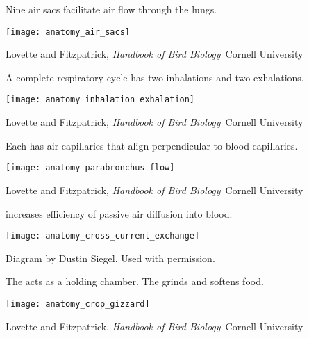 \documentclass[t]{beamer}
\begin{document}
{
\begin{frame}[t,plain]{Nine air sacs facilitate air flow through the lungs.}

	\vspace{-0.5\baselineskip}
	
	\centering
	
	\texttt{[image: anatomy\_air\_sacs]}
	
	\vfilll
	
	\tiny \hfill Lovette and Fitzpatrick, \textit{Handbook of Bird Biology} \textcopyright\,Cornell University
\end{frame}
}
%
\begin{frame}[t,plain]{A complete respiratory cycle has two inhalations and two exhalations.}

	\texttt{[image: anatomy\_inhalation\_exhalation]}
		
	\vfilll
	
	\tiny \hfill Lovette and Fitzpatrick, \textit{Handbook of Bird Biology} \textcopyright\,Cornell University
\end{frame}
\begin{frame}[t,plain]{Each  has air capillaries that align perpendicular to blood capillaries.}

	\texttt{[image: anatomy\_parabronchus\_flow]}
		
	\vfilll
	
	\tiny \hfill Lovette and Fitzpatrick, \textit{Handbook of Bird Biology} \textcopyright\,Cornell University

\end{frame}

\begin{frame}[t,plain]{ increases efficiency of passive air diffusion into blood.}

	\centering
	
	\texttt{[image: anatomy\_cross\_current\_exchange]}
		
	\vfilll
	
	\tiny \hfill Diagram by Dustin Siegel. Used with permission.
\end{frame}


\begin{frame}[t]{The  acts as a holding chamber. The  grinds and softens food.}

	\vspace{-\baselineskip}
	
	\centering
	
	\texttt{[image: anatomy\_crop\_gizzard]}
		
	\vfilll
	
	\tiny \hfill Lovette and Fitzpatrick, \textit{Handbook of Bird Biology} \textcopyright\,Cornell University

\end{frame}
\end{document}
